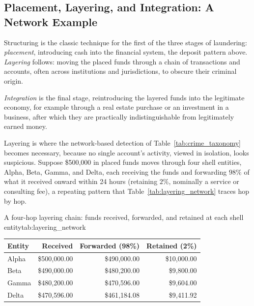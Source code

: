 \documentclass[../ai_in_finance]{subfiles}
\begin{document}
\subsection{Placement, Layering, and Integration: A Network Example}
\label{sec:aml-network}

Structuring is the classic technique for the first of the three stages of laundering: \emph{placement}, introducing cash into the financial system, the deposit pattern above. \emph{Layering} follows: moving the placed funds through a chain of transactions and accounts, often across institutions and jurisdictions, to obscure their criminal origin.

\emph{Integration} is the final stage, reintroducing the layered funds into the legitimate economy, for example through a real estate purchase or an investment in a business, after which they are practically indistinguishable from legitimately earned money.

Layering is where the network-based detection of Table~\ref{tab:crime_taxonomy} becomes necessary, because no single account's activity, viewed in isolation, looks suspicious. Suppose \$500,000 in placed funds moves through four shell entities, Alpha, Beta, Gamma, and Delta, each receiving the funds and forwarding $98\%$ of what it received onward within 24 hours (retaining $2\%$, nominally a service or consulting fee), a repeating pattern that Table~\ref{tab:layering_network} traces hop by hop.

\begin{booktable}[htbp]{A four-hop layering chain: funds received, forwarded, and retained at each shell entity}{tab:layering_network}
\begin{tabular}{lrrr}
\toprule
Entity & Received & Forwarded (98\%) & Retained (2\%) \\
\midrule
Alpha & \$500{,}000.00 & \$490{,}000.00 & \$10{,}000.00 \\
Beta  & \$490{,}000.00 & \$480{,}200.00 & \$9{,}800.00 \\
Gamma & \$480{,}200.00 & \$470{,}596.00 & \$9{,}604.00 \\
Delta & \$470{,}596.00 & \$461{,}184.08 & \$9{,}411.92 \\
\bottomrule
\end{tabular}
\end{booktable}
\end{document}
